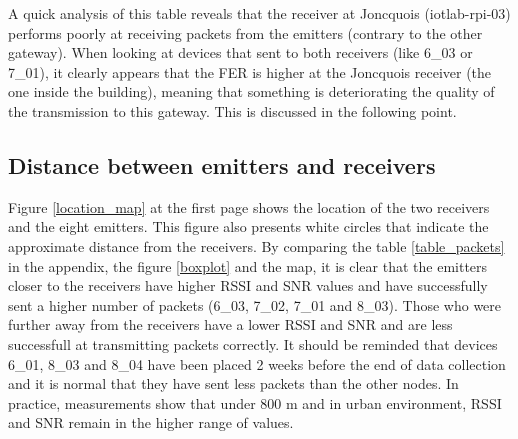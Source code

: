 \documentclass[letterpaper, 10 pt, conference]{ieeeconf}  %
\begin{document}
A quick analysis of this table reveals that the receiver at Joncquois (iotlab-rpi-03) performs poorly at receiving packets from the emitters (contrary to the other gateway). When looking at devices that sent to both receivers (like 6\_03 or 7\_01), it clearly appears that the FER is higher at the Joncquois receiver (the one inside the building), meaning that something is deteriorating the quality of the transmission to this gateway. This is discussed in the following point.

\subsection{Distance between emitters and receivers}
Figure \ref{location_map} at the first page shows the location of the two receivers and the eight emitters. This figure also presents white circles that indicate the approximate distance from the receivers. By comparing the table \ref{table_packets} in the appendix, the figure \ref{boxplot} and the map, it is clear that the emitters closer to the receivers have higher RSSI and SNR values and have successfully sent a higher number of packets (6\_03, 7\_02, 7\_01 and 8\_03). Those who were further away from the receivers have a lower RSSI and SNR and are less successfull at transmitting packets correctly. It should be reminded that devices 6\_01, 8\_03 and 8\_04 have been placed 2 weeks before the end of data collection and it is normal that they have sent less packets than the other nodes. In practice, measurements show that under 800 m and in urban environment, RSSI and SNR remain in the higher range of values.
\end{document}
